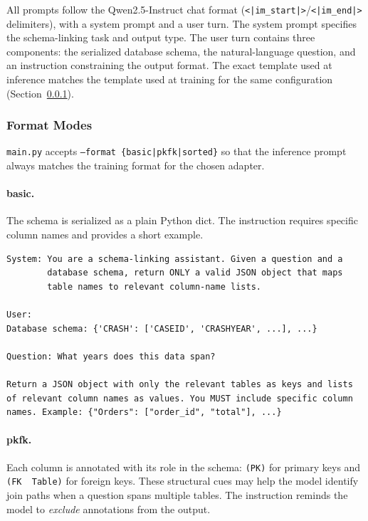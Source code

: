 \documentclass[11pt,letterpaper]{article}
\begin{document}
All prompts follow the Qwen2.5-Instruct chat format
(\texttt{<|im\_start|>}/\texttt{<|im\_end|>} delimiters), with a system
prompt and a user turn.
The system prompt specifies the schema-linking task and output type.
The user turn contains three components: the serialized database schema,
the natural-language question, and an instruction constraining the output
format.
The exact template used at inference matches the template used at training
for the same configuration (Section~\ref{sec:prompt-formats}).

\subsubsection{Format Modes}
\label{sec:prompt-formats}

\texttt{main.py} accepts \texttt{--format \{basic|pkfk|sorted\}} so that the
inference prompt always matches the training format for the chosen adapter.

\paragraph{basic.}
The schema is serialized as a plain Python dict.
The instruction requires specific column names and provides a short example.
\begin{lstlisting}
System: You are a schema-linking assistant. Given a question and a
        database schema, return ONLY a valid JSON object that maps
        table names to relevant column-name lists.

User:
Database schema: {'CRASH': ['CASEID', 'CRASHYEAR', ...], ...}

Question: What years does this data span?

Return a JSON object with only the relevant tables as keys and lists
of relevant column names as values. You MUST include specific column
names. Example: {"Orders": ["order_id", "total"], ...}
\end{lstlisting}

\paragraph{pkfk.}
Each column is annotated with its role in the schema:
\texttt{(PK)} for primary keys and \texttt{(FK\,\textrightarrow\,Table)} for
foreign keys.
These structural cues may help the model identify join paths when a question
spans multiple tables.
The instruction reminds the model to \emph{exclude} annotations from the
output.
\end{document}
